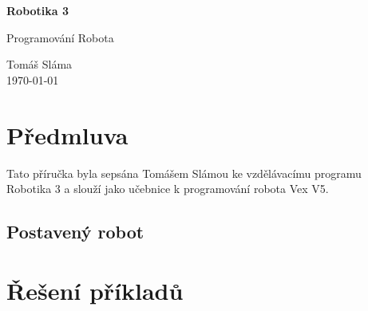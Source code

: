 \documentclass[11pt]{article}
\begin{document}
\begin{titlepage}
    \begin{center}
        \vspace*{1cm}
            
        \Huge
        \textbf{Robotika 3}
            
        \vspace{0.5cm}
        \LARGE
				Programování Robota
        
        \vspace{1.5cm}
        
        \vfill
        \flushright
        \normalsize
				Tomáš Sláma\\
				\today
        
    \end{center}
\end{titlepage}

\tableofcontents
\clearpage

\renewcommand\thequestion{\thesection.\arabic{question}}

\newcommand{\block}{$\vcenter{\hbox{\texttt{[image: ../Images/blocky-logo.png]}}}$}
\newcommand{\blockimage}[2]{$\vcenter{\hbox{\texttt{[image: \#2]}}}$}

\setcounter{secnumdepth}{0}
\section{Předmluva}
\setcounter{secnumdepth}{3}

Tato příručka byla sepsána Tomášem Slámou ke vzdělávacímu programu Robotika 3 a slouží jako učebnice k programování robota Vex V5.

\subsection{Postavený robot}

\newpage


\newpage

\newpage

\newpage

\newpage

\newpage

\newpage

\newpage

\setcounter{secnumdepth}{0}
\section{Řešení příkladů}
\setcounter{secnumdepth}{3}

\printsolutions
\end{document}
